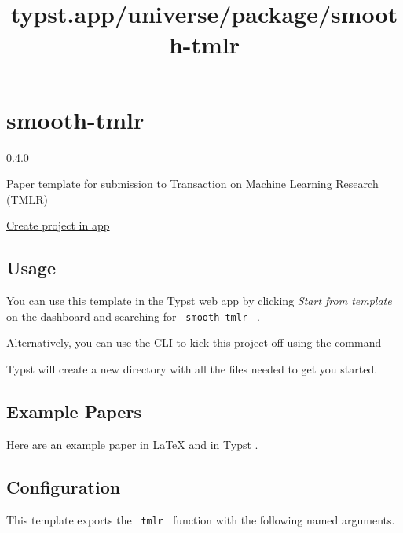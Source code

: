 \title{typst.app/universe/package/smooth-tmlr}

\label{banner}
\label{template-thumbnail}

\section{smooth-tmlr}\label{smooth-tmlr}

{ 0.4.0 }

Paper template for submission to Transaction on Machine Learning
Research (TMLR)

\href{/app?template=smooth-tmlr&version=0.4.0}{Create project in app}

\label{readme}
\subsection{Usage}\label{usage}

You can use this template in the Typst web app by clicking \emph{Start
from template} on the dashboard and searching for
\texttt{\ smooth-tmlr\ } .

Alternatively, you can use the CLI to kick this project off using the
command

\begin{Shaded}
\begin{Highlighting}[]
\end{Highlighting}
\end{Shaded}

Typst will create a new directory with all the files needed to get you
started.

\subsection{Example Papers}\label{example-papers}

Here are an example paper in
\href{https://github.com/daskol/typst-templates}{LaTeX} and in
\href{https://github.com/daskol/typst-templates/\#colored-annotations}{Typst}
.

\subsection{Configuration}\label{configuration}

This template exports the \texttt{\ tmlr\ } function with the following
named arguments.

